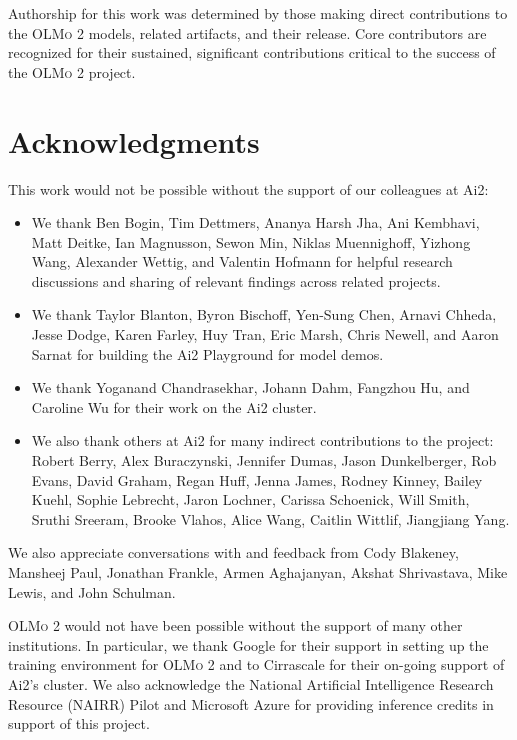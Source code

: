 \documentclass[table]{ai2style/ai2}
\newcommand{\olmotoo}{\textsc{OLMo 2}\xspace}
\begin{document}
Authorship for this work was determined by those making direct contributions to the \olmotoo models, related artifacts, and their release. Core contributors are recognized for their sustained, significant contributions critical to the success of the \olmotoo project.

\section*{Acknowledgments}
\label{sec:acks}

This work would not be possible without the support of our colleagues at Ai2:

\begin{itemize}
    \item We thank Ben Bogin, Tim Dettmers, Ananya Harsh Jha, Ani Kembhavi, Matt Deitke, Ian Magnusson, Sewon Min, Niklas Muennighoff, Yizhong Wang, Alexander Wettig, and Valentin Hofmann for helpful research discussions and sharing of relevant findings across related projects.
    \item We thank Taylor Blanton, Byron Bischoff, Yen-Sung Chen, Arnavi Chheda, Jesse Dodge, Karen Farley, Huy Tran, Eric Marsh, Chris Newell, and Aaron Sarnat for building the Ai2 Playground for model demos.
    \item We thank Yoganand Chandrasekhar, Johann Dahm, Fangzhou Hu, and Caroline Wu for their work on the Ai2 cluster.
    \item We also thank others at Ai2 for many indirect contributions to the project: Robert Berry, Alex Buraczynski, Jennifer Dumas, Jason Dunkelberger, Rob Evans, David Graham, Regan Huff, Jenna James, Rodney Kinney, Bailey Kuehl, Sophie Lebrecht, Jaron Lochner, Carissa Schoenick, Will Smith, Sruthi Sreeram, Brooke Vlahos, Alice Wang, Caitlin Wittlif, Jiangjiang Yang.
\end{itemize}

We also appreciate conversations with and feedback from Cody Blakeney, Mansheej Paul, Jonathan Frankle, Armen Aghajanyan, Akshat Shrivastava, Mike Lewis, and John Schulman.

\olmotoo would not have been possible without the support of many other institutions. 
In particular, we thank Google for their support in setting up the training environment for \olmotoo and to Cirrascale for their on-going support of Ai2's cluster.
We also acknowledge the National Artificial Intelligence Research Resource (NAIRR) Pilot and Microsoft Azure for providing inference credits in support of this project.
\end{document}
